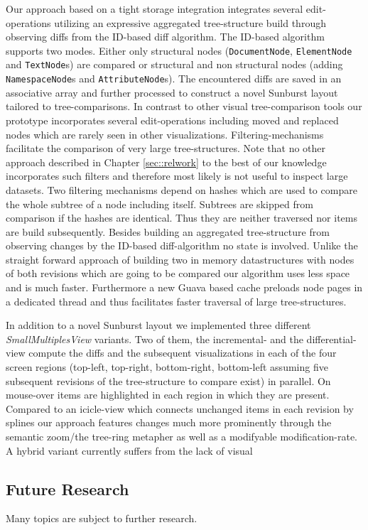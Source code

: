 Our approach based on a tight storage integration integrates several edit-operations utilizing an expressive aggregated tree-structure build through observing diffs from the ID-based diff algorithm. The ID-based algorithm supports two modes. Either only structural nodes (\texttt{DocumentNode}, \texttt{ElementNode} and \texttt{TextNode}s) are compared or structural and non structural nodes (adding \texttt{NamespaceNode}s and \texttt{AttributeNode}s). The encountered diffs are saved in an associative array and further processed to construct a novel Sunburst layout tailored to tree-comparisons. In contrast to other visual tree-comparison tools our prototype incorporates several edit-operations including moved and replaced nodes which are rarely seen in other visualizations. Filtering-mechanisms facilitate the comparison of very large tree-structures. Note that no other approach described in Chapter \ref{sec::relwork} to the best of our knowledge incorporates such filters and therefore most likely is not useful to inspect large datasets. Two filtering mechanisms depend on hashes which are used to compare the whole subtree of a node including itself. Subtrees are skipped from comparison if the hashes are identical. Thus they are neither traversed nor items are build subsequently. Besides building an aggregated tree-structure from observing changes by the ID-based diff-algorithm no state is involved. Unlike the straight forward approach of building two in memory datastructures with nodes of both revisions which are going to be compared our algorithm uses less space and is much faster. Furthermore a new Guava based cache preloads node pages in a dedicated thread and thus facilitates faster traversal of large tree-structures.

In addition to a novel Sunburst layout we implemented three different \emph{SmallMultiplesView} variants. Two of them, the incremental- and the differential-view compute the diffs and the subsequent visualizations in each of the four screen regions (top-left, top-right, bottom-right, bottom-left assuming five subsequent revisions of the tree-structure to compare exist) in parallel. On mouse-over items are highlighted in each region in which they are present. Compared to an icicle-view which connects unchanged items in each revision by splines our approach features changes much more prominently through the semantic zoom/the tree-ring metapher as well as a modifyable modification-rate. A hybrid variant currently suffers from the lack of visual 

\subsection{Future Research}
Many topics are subject to further research. 

